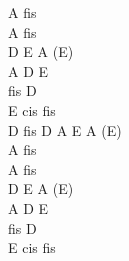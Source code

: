 \documentclass[a5paper, 10pt]{book}
\begin{document}
\begin{minipage}[t]{0.2\textwidth}
  A fis\\
 A fis\\
 D E A (E)\\
 A D E\\
 fis D\\
 E cis fis\\

D fis D A E A (E)\\

  A fis\\
 A fis\\
 D E A (E)\\
 A D E\\
 fis D\\
 E cis fis\\
\end{minipage}

\newpage
\end{document}
